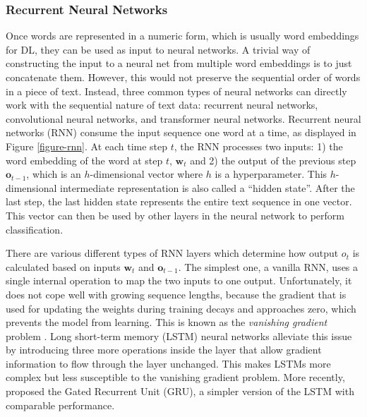 \subsubsection{Recurrent Neural Networks}
Once words are represented in a numeric form, which is usually word embeddings for DL, they can be used as input to neural networks. A trivial way of constructing the input to a neural net from multiple word embeddings is to just concatenate them. However, this would not preserve the sequential order of words in a piece of text. Instead, three common types of neural networks can directly work with the sequential nature of text data: recurrent neural networks, convolutional neural networks, and transformer neural networks.\newline 
 Recurrent neural networks (RNN) consume the input sequence one word at a time, as displayed in Figure \ref{figure-rnn}. At each time step $t$, the RNN processes two inputs: 1) the word embedding of the word at step $t$, $\bm{w}_t$ and 2) the output of the previous step $\bm{o}_{t-1}$, which is an $h$-dimensional vector where $h$ is a hyperparameter. This $h$-dimensional intermediate representation is also called a ``hidden state''. After the last step, the last hidden state represents the entire text sequence in one vector. This vector can then be used by other layers in the neural network to perform classification. 



There are various different types of RNN layers which determine how output $o_t$ is calculated based on inputs $\bm{w}_t$ and $\bm{o}_{t-1}$. The simplest one, a vanilla RNN, uses a single internal operation to map the two inputs to one output. Unfortunately, it does not cope well with growing sequence lengths, because the gradient that is used for updating the weights during training decays and approaches zero, which prevents the model from learning. This is known as the \emph{vanishing gradient} problem . Long short-term memory (LSTM) neural networks  alleviate this issue by introducing three more operations inside the layer that allow gradient information to flow through the layer unchanged. This makes LSTMs more complex but less susceptible to the vanishing gradient problem. More recently,  proposed the Gated Recurrent Unit (GRU), a simpler version of the LSTM with comparable performance.

